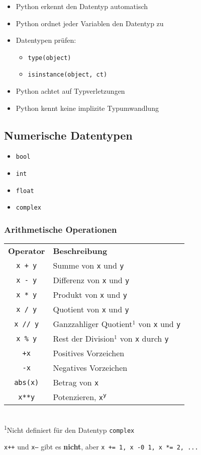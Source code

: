 \begin{itemize}
	\item Python erkennt den Datentyp automatisch
	\item Python ordnet jeder Variablen den Datentyp zu
	\item Datentypen prüfen:
	\begin{itemize}
		\item[\-] \texttt{type(object)}
		\item[\-] \texttt{isinstance(object, ct)}
	\end{itemize}
	\item Python achtet auf Typverletzungen
	\item Python kennt keine implizite Typumwandlung
\end{itemize}

\subsection{Numerische Datentypen}
\begin{itemize}
	\item \texttt{bool}
	\item \texttt{int}
	\item \texttt{float}
	\item \texttt{complex}
\end{itemize}

\subsubsection{Arithmetische Operationen}
\begin{tabular}{|c|l|}
	\hline 
	\textbf{Operator} &\textbf{Beschreibung}\\ 
	\texttt{x + y} &Summe von \texttt{x} und \texttt{y}\\ 
	\texttt{x - y} &Differenz von \texttt{x} und \texttt{y}\\ 
	\texttt{x * y} &Produkt von \texttt{x} und \texttt{y}\\ 
	\texttt{x / y} &Quotient von \texttt{x} und \texttt{y}\\  
	\texttt{x // y} &Ganzzahliger Quotient$^1$ von \texttt{x} und \texttt{y}\\ 
	\texttt{x \% y} &Rest der Division$^1$ von \texttt{x} durch \texttt{y}\\ 
	\texttt{+x} &Positives Vorzeichen\\ 
	\texttt{-x} &Negatives Vorzeichen\\ 
	\texttt{abs(x)} &Betrag von \texttt{x}\\ 
	\texttt{x**y} &Potenzieren, \texttt{x\textsuperscript{y}}\\ 
	\hline 
\end{tabular}\\
\textsuperscript{1}Nicht definiert für den Datentyp \texttt{complex}\\
\begin{achtung}
	\texttt{x++} und \texttt{x--} gibt es \textbf{nicht}, aber \texttt{x += 1, x -0 1, x *= 2, ...}
\end{achtung}

